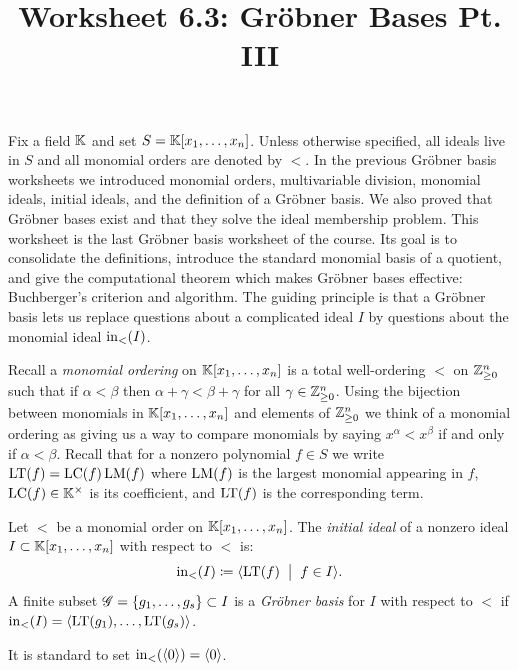 \documentclass[12pt,reqno]{amsart}
\title{Worksheet 6.3: Gr\"obner Bases Pt. III}
\begin{document}

\maketitle
\thispagestyle{firstpageIP}

Fix a field $\mathbb{K}$ and set $S=\mathbb{K}[x_1,\ldots,x_n]$. Unless otherwise specified, all ideals live in $S$ and all monomial orders are denoted by $<$. In the previous Gr\"obner basis worksheets we introduced monomial orders, multivariable division, monomial ideals, initial ideals, and the definition of a Gr\"obner basis. We also proved that Gr\"obner bases exist and that they solve the ideal membership problem. This worksheet is the last Gr\"obner basis worksheet of the course. Its goal is to consolidate the definitions, introduce the standard monomial basis of a quotient, and give the computational theorem which makes Gr\"obner bases effective: Buchberger's criterion and algorithm. The guiding principle is that a Gr\"obner basis lets us replace questions about a complicated ideal $I$ by questions about the monomial ideal $\operatorname{in}_<(I)$.

Recall a \emph{monomial ordering} on $\mathbb{K}[x_1,\ldots,x_n]$ is a total well-ordering $<$ on $\mathbb{Z}^{n}_{\geq0}$ such that if $\alpha < \beta$ then $\alpha + \gamma < \beta+\gamma$ for all $\gamma \in \mathbb{Z}^{n}_{\geq0}$. Using the bijection between monomials in $\mathbb{K}[x_1,\ldots,x_n]$  and elements of $\mathbb{Z}^{n}_{\geq0}$ we think of a monomial ordering as giving us a way to compare monomials by saying $x^{\alpha} < x^{\beta}$ if and only if $\alpha < \beta$. Recall that for a nonzero polynomial $f\in S$ we write $\operatorname{LT}(f)=\operatorname{LC}(f)\operatorname{LM}(f)$ where $\operatorname{LM}(f)$ is the largest monomial appearing in $f$, $\operatorname{LC}(f)\in \mathbb{K}^{\times}$ is its coefficient, and $\operatorname{LT}(f)$ is the corresponding term. 

\begin{definition}
Let $<$ be a monomial order on $\mathbb{K}[x_1,\ldots,x_n]$.  The \emph{initial ideal} of a nonzero ideal $I \subset \mathbb{K}[x_1,\ldots,x_n]$ with respect to $<$ is:
\[
\operatorname{in}_{<}(I) \coloneqq \langle \operatorname{LT}(f) \;\; \big| \;\; f \in I \rangle. 
\]
A finite subset $\mathcal{G} =\{g_1,\ldots,g_s\} \subset I$ is a \emph{Gr\"{o}bner basis} for $I$ with respect to $<$ if $\operatorname{in}_{<}(I) = \langle \operatorname{LT}(g_1), \ldots, \operatorname{LT}(g_s)\rangle$.
\end{definition}

It is standard to set $\operatorname{in}_{<}(\langle0\rangle)=\langle 0\rangle$. 
\end{document}
